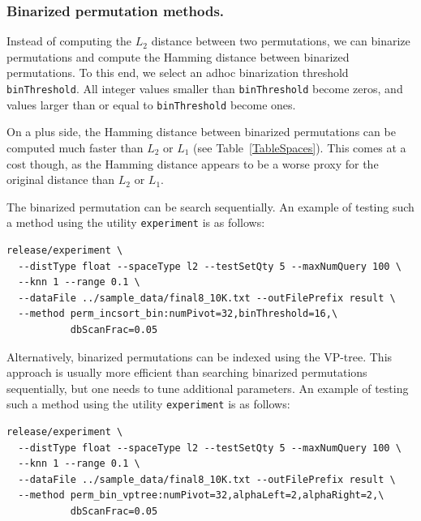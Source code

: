 \documentclass[runningheads,a4paper]{llncs}
\begin{document}
\subsubsection{Binarized permutation methods.}\label{SectionPermBinary}
Instead of computing the $L_2$ distance between two permutations,
we can binarize permutations and compute the Hamming distance between
binarized permutations. 
To this end, we select an adhoc binarization threshold \texttt{binThreshold}.
All integer values smaller than \texttt{binThreshold} become zeros,
and values larger than or equal to \texttt{binThreshold} become ones.

On a plus side, the Hamming distance between binarized permutations can be computed much faster than $L_2$ or $L_1$ (see Table~\ref{TableSpaces}). This comes at a cost though, as the Hamming distance appears to be a worse proxy for the original distance than $L_2$ or $L_1$.

The binarized permutation can be search sequentially. 
An example of testing such a method using the utility \texttt{experiment} is as follows:
{
\footnotesize
\begin{verbatim}
release/experiment \
  --distType float --spaceType l2 --testSetQty 5 --maxNumQuery 100 \
  --knn 1 --range 0.1 \
  --dataFile ../sample_data/final8_10K.txt --outFilePrefix result \
  --method perm_incsort_bin:numPivot=32,binThreshold=16,\
           dbScanFrac=0.05
\end{verbatim}
}

Alternatively, binarized permutations can be indexed using the VP-tree.
This approach is usually more efficient than searching binarized permutations sequentially,
 but one needs to tune additional parameters.
An example of testing such a method using the utility \texttt{experiment} is as follows:
{
\footnotesize
\begin{verbatim}
release/experiment \
  --distType float --spaceType l2 --testSetQty 5 --maxNumQuery 100 \
  --knn 1 --range 0.1 \
  --dataFile ../sample_data/final8_10K.txt --outFilePrefix result \
  --method perm_bin_vptree:numPivot=32,alphaLeft=2,alphaRight=2,\
           dbScanFrac=0.05
\end{verbatim}
}
\end{document}
